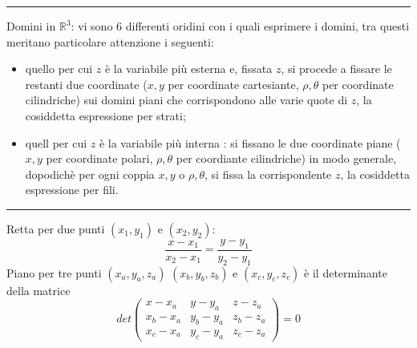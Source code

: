 \rule{\textwidth}{0,4pt}\newline
Domini in $\mathbb{R}^3$: vi sono 6 differenti oridini con i quali esprimere i domini, tra questi meritano particolare attenzione i seguenti:
\begin{itemize}
    \item quello per cui $z$ è la variabile più esterna e, fissata $z$, si procede a fissare le restanti due coordinate ($x,y$ per coordinate cartesiante, $\rho, \theta$ per coordinate cilindriche) sui domini piani che corrispondono alle varie quote di $z$, la cosiddetta espressione per strati;
    \item quell per cui $z$ è la variabile più interna : si fissano le due coordinate piane ($x,y$ per coordinate polari, $\rho, \theta$ per coordiante cilindriche) in modo generale, dopodichè per ogni coppia $x,y$ o $\rho, \theta$, si fissa la corrispondente $z$, la cosiddetta espressione per fili.
\end{itemize}
\rule{\textwidth}{0,4pt}\newline
\begin{tcolorbox}
Retta per due punti $(x_1, y_1)$ e $(x_2, y_2)$:
\[
    \frac{x - x_1}{x_2 - x_1} = \frac{y-y_1}{y_2 - y_1}
\]
Piano per tre punti $(x_a, y_a, z_a)$ $(x_b, y_b, z_b)$ e $(x_c, y_c, z_c)$ è il determinante della matrice 
\[
    det\left(\begin{matrix}
        x-x_a & y-y_a & z-z_a\\
        x_b-x_a & y_b-y_a & z_b-z_a\\
        x_c-x_a & y_c - y_a & z_c -z_a 
    \end{matrix}\right) = 0
\]
\end{tcolorbox}